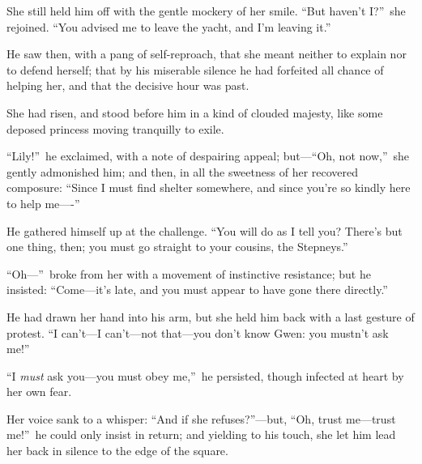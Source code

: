 \documentclass[12pt,a4paper]{book}
\begin{document}
She still held him off with the gentle mockery of her smile. ``But
haven't I?''\ she rejoined. ``You advised me to leave the yacht, and
I'm leaving it.''





He saw then, with a pang of self-reproach, that she meant neither
to explain nor to defend herself; that by his miserable silence
he had forfeited all chance of helping her, and that the decisive
hour was past.





She had risen, and stood before him in a kind of clouded majesty,
like some deposed princess moving tranquilly to exile.





``Lily!''\ he exclaimed, with a note of despairing appeal; but---``Oh,
not now,''\ she gently admonished him; and then, in all the
sweetness of her recovered composure: ``Since I must find shelter
somewhere, and since you're so kindly here to help me----''





He gathered himself up at the challenge. ``You will do as I tell
you? There's but one thing, then; you must go straight to your
cousins, the Stepneys.''





``Oh---''\ broke from her with a movement of instinctive resistance;
but he insisted: ``Come---it's late, and you must appear to have
gone there directly.''





He had drawn her hand into his arm, but she held him back with a
last gesture of protest. ``I can't---I can't---not that---you don't
know Gwen: you mustn't ask me!''





``I \textit{must} ask you---you must obey me,''\ he persisted, though infected
at heart by her own fear.





Her voice sank to a whisper: ``And if she refuses?''---but, ``Oh,
trust me---trust me!''\ he could only insist in return; and yielding
to his touch, she let him lead her back in silence to the edge of
the square.
\end{document}
